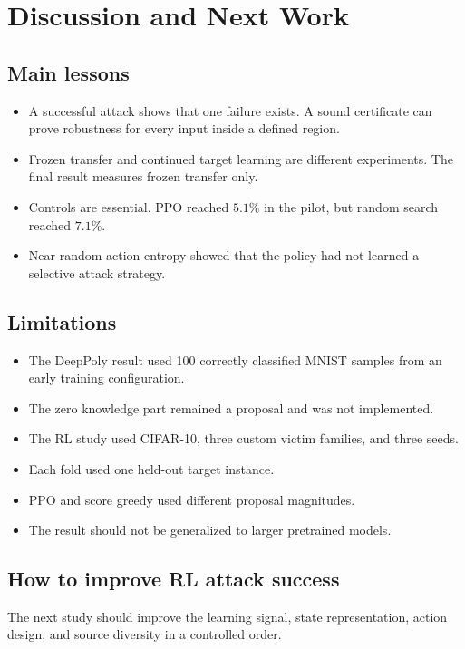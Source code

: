 \documentclass[11pt,a4paper]{report}
\begin{document}
\chapter{Discussion and Next Work}

\section{Main lessons}

\begin{itemize}
  \item A successful attack shows that one failure exists. A sound certificate can prove robustness for every input inside a defined region.
  \item Frozen transfer and continued target learning are different experiments. The final result measures frozen transfer only.
  \item Controls are essential. PPO reached \(5.1\%\) in the pilot, but random search reached \(7.1\%\).
  \item Near-random action entropy showed that the policy had not learned a selective attack strategy.
\end{itemize}

\section{Limitations}

\begin{itemize}
  \item The DeepPoly result used 100 correctly classified MNIST samples from an early training configuration.
  \item The zero knowledge part remained a proposal and was not implemented.
  \item The RL study used CIFAR-10, three custom victim families, and three seeds.
  \item Each fold used one held-out target instance.
  \item PPO and score greedy used different proposal magnitudes.
  \item The result should not be generalized to larger pretrained models.
\end{itemize}

\section{How to improve RL attack success}

The next study should improve the learning signal, state representation, action design, and source diversity in a controlled order.
\end{document}
